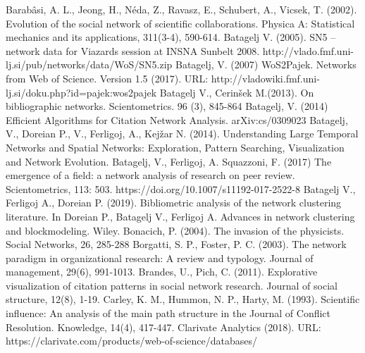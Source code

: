 \documentclass[11pt]{article} %
\begin{document}
\begin{thebibliography}{99}
   Barabâsi, A. L., Jeong, H., Néda, Z., Ravasz, E., Schubert, A., Vicsek, T. (2002). Evolution of the social network of scientific collaborations. Physica A: Statistical mechanics and its applications, 311(3-4), 590-614.
   Batagelj V. (2005). SN5 -- network data for Viazards session at INSNA Sunbelt 2008. http://vlado.fmf.uni-lj.si/pub/networks/data/WoS/SN5.zip      
   Batagelj, V. (2007) WoS2Pajek. Networks from Web of Science. Version 1.5 (2017). URL: http://vladowiki.fmf.uni-lj.si/doku.php?id=pajek:wos2pajek 
   Batagelj V., Cerinšek M.(2013). On bibliographic networks. Scientometrics. 96 (3), 845-864
   Batagelj, V. (2014) Efficient Algorithms for Citation Network Analysis. arXiv:cs/0309023 
   Batagelj, V., Doreian P., V., Ferligoj, A., Kejžar N. (2014). Understanding Large Temporal Networks and Spatial Networks: Exploration, Pattern Searching, Visualization and Network Evolution. 
   Batagelj, V., Ferligoj, A. Squazzoni, F. (2017) The emergence of a field: a network analysis of research on peer review. Scientometrics,  113: 503. https://doi.org/10.1007/s11192-017-2522-8  
   Batagelj V., Ferligoj A., Doreian P. (2019). Bibliometric analysis of the network clustering literature. In Doreian P., Batagelj V., Ferligoj A. Advances in network clustering and blockmodeling. Wiley. 
   Bonacich, P. (2004). The invasion of the physicists. Social Networks, 26, 285-288
   Borgatti, S. P., Foster, P. C. (2003). The network paradigm in organizational research: A review and typology. Journal of management, 29(6), 991-1013.
   Brandes, U., Pich, C. (2011). Explorative visualization of citation patterns in social network research. Journal of social structure, 12(8), 1-19.
   Carley, K. M., Hummon, N. P., Harty, M. (1993). Scientific influence: An analysis of the main path structure in the Journal of Conflict Resolution. Knowledge, 14(4), 417-447.
   Clarivate Analytics (2018). URL: https://clarivate.com/products/web-of-science/databases/

\end{thebibliography}
\end{document}
